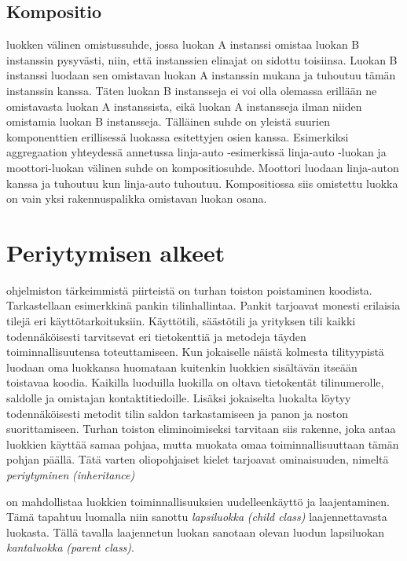 \documentclass[a4paper,justified,notoc]{tufte-book}
\newcommand{\eng}[1]{\textit{(#1)}}
\newcommand{\new}[1]{\textit{\gls{#1}}}
\newcommand{\neweng}[2]{\new{#1} \eng{#2}}
\begin{document}
\begin{fullwidth}
\subsection{Kompositio}
\label{kompositio}

 luokken välinen omistussuhde, jossa luokan A instanssi omistaa
luokan B instanssin pysyvästi, niin, että instanssien elinajat on sidottu toisiinsa. Luokan B
instanssi luodaan sen omistavan luokan A instanssin mukana ja tuhoutuu tämän instanssin kanssa.
Täten luokan B instansseja ei voi olla olemassa erillään ne omistavasta luokan A instanssista,
eikä luokan A instansseja ilman niiden omistamia luokan B instansseja. Tälläinen suhde on yleistä
suurien komponenttien erillisessä luokassa esitettyjen osien kanssa. Esimerkiksi aggregaation
yhteydessä annetussa linja-auto -esimerkissä linja-auto -luokan ja moottori-luokan välinen suhde
on kompositiosuhde. Moottori luodaan linja-auton kanssa ja tuhoutuu kun linja-auto tuhoutuu.
Kompositiossa siis omistettu luokka on vain yksi rakennuspalikka omistavan luokan osana.


\section{Periytymisen alkeet}
\label{periytyminen1}

 ohjelmiston tärkeimmistä piirteistä on turhan toiston poistaminen
koodista. Tarkastellaan esimerkkinä pankin tilinhallintaa. Pankit tarjoavat monesti erilaisia
tilejä eri käyttötarkoituksiin. Käyttötili, säästötili ja yrityksen tili kaikki todennäköisesti
tarvitsevat eri tietokenttiä ja metodeja täyden toiminnallisuutensa toteuttamiseen. Kun jokaiselle
näistä kolmesta tilityypistä luodaan oma luokkansa huomataan kuitenkin luokkien sisältävän
itseään toistavaa koodia. Kaikilla luoduilla luokilla on oltava tietokentät tilinumerolle,
saldolle ja omistajan kontaktitiedoille. Lisäksi jokaiselta luokalta löytyy todennäköisesti
metodit tilin saldon tarkastamiseen ja panon ja noston suorittamiseen. Turhan toiston
eliminoimiseksi tarvitaan siis rakenne, joka antaa luokkien käyttää samaa pohjaa, mutta muokata
omaa toiminnallisuuttaan tämän pohjan päällä. Tätä varten oliopohjaiset kielet tarjoavat
ominaisuuden, nimeltä \neweng{periytyminen}{inheritance}

 on mahdollistaa luokkien toiminnallisuuksien uudelleenkäyttö
ja laajentaminen. Tämä tapahtuu luomalla niin sanottu \neweng{lapsiluokka}{child class}
laajennettavasta luokasta. Tällä tavalla laajennetun luokan sanotaan olevan luodun lapsiluokan
\neweng{kantaluokka}{parent class}.


\end{fullwidth}
\end{document}
